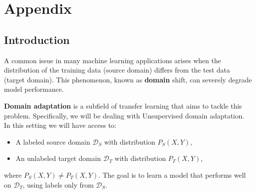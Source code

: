 \documentclass{article}
\begin{document}
\newpage
\section{Appendix}


\subsection{Introduction}

A common issue in many machine learning applications arises when the distribution of the training data (source domain) differs from the test data (target domain). This phenomenon, known as \textbf{domain} shift, can severely degrade model performance. 

\textbf{Domain adaptation} is a subfield of transfer learning that aims to tackle this problem. Specifically, we will be dealing with Unsupervised domain adaptation. In this setting we will have access to:
\begin{itemize}[noitemsep]
    \item A labeled source domain \( \mathcal{D}_S \) with distribution \( P_S(X, Y) \),
    \item An unlabeled target domain \( \mathcal{D}_T \) with distribution \( P_T(X, Y) \),
\end{itemize}
where \( P_S(X, Y) \neq P_T(X, Y) \). The goal is to learn a model that performs well on \( \mathcal{D}_T \), using labels only from \( \mathcal{D}_S \).





\end{document}
